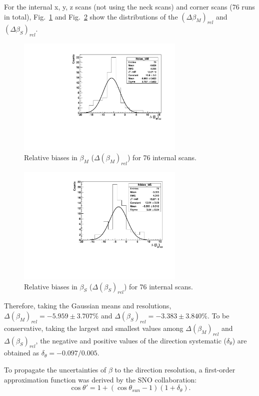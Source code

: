 For the internal x, y, z scans (not using the neck scans) and corner scans (76 runs in total), Fig.~\ref{relative_biases_betaM} and Fig.~\ref{relative_biases_betaS} show the distributions of the $(\Delta \beta_M)_{rel}$ and $(\Delta \beta_S)_{rel}$.
\begin{figure}
	\centering
     \includegraphics[width=8cm]{relativeBias_betaM.pdf}
	\caption{Relative biases in $\beta_M$ ($\Delta(\beta_M)_{rel}$) for 76 internal scans.}
	\label{relative_biases_betaM}
\end{figure}
\begin{figure}
		\centering
	\includegraphics[width=8cm]{relativeBias_betaS.pdf}
\caption{Relative biases in $\beta_S$ ($\Delta(\beta_S)_{rel}$) for 76 internal scans.}
\label{relative_biases_betaS}
\end{figure}
	
Therefore, taking the Gaussian means and resolutions, $\Delta(\beta_M)_{rel}=-5.959\pm 3.707\%$ and $\Delta(\beta_S)_{rel}=-3.383\pm 3.840\%$. To be conservative, taking the largest and smallest values among $\Delta(\beta_M)_{rel}$ and $\Delta(\beta_S)_{rel}$, the negative and positive values of the direction systematic ($\delta_\theta$) are obtained as $\delta_\theta=-0.097/0.005$.

To propagate the uncertainties of $\beta$ to the direction resolution, a first-order approximation function was derived by the SNO collaboration\cite{drouin2012three}:
\begin{equation}\label{remapTheta}
\cos\theta'=1+(\cos\theta_{sun}-1)(1+\delta_{\theta}).
\end{equation} 

